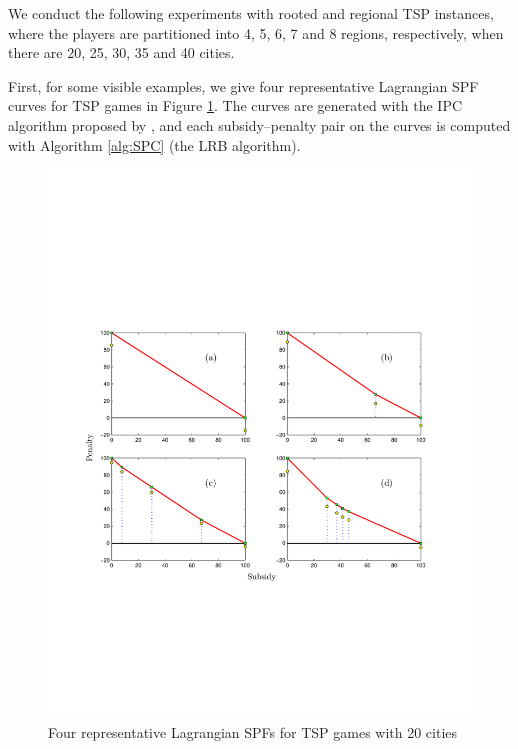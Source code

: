 \documentclass[authoryear,review,12pt]{elsarticle}
\begin{document}
We conduct the following experiments with rooted and regional TSP instances, where the players are partitioned into 4, 5, 6, 7 and 8 regions, respectively, when there are 20, 25, 30, 35 and 40 cities.

First, for some visible examples, we give four representative Lagrangian SPF curves for TSP games in Figure \ref{figure:20partitioned}.
The curves are generated with the IPC algorithm proposed by \cite{leastcore2018}, and each subsidy--penalty pair on the curves is computed with Algorithm \ref{alg:SPC} (the LRB algorithm).


\begin{figure}[H]
\centering
\includegraphics[width=1\textwidth]{e5.pdf}
\centering
\caption{\label{figure:20partitioned}Four representative Lagrangian SPFs for TSP games with 20 cities}
\end{figure}
\end{document}
